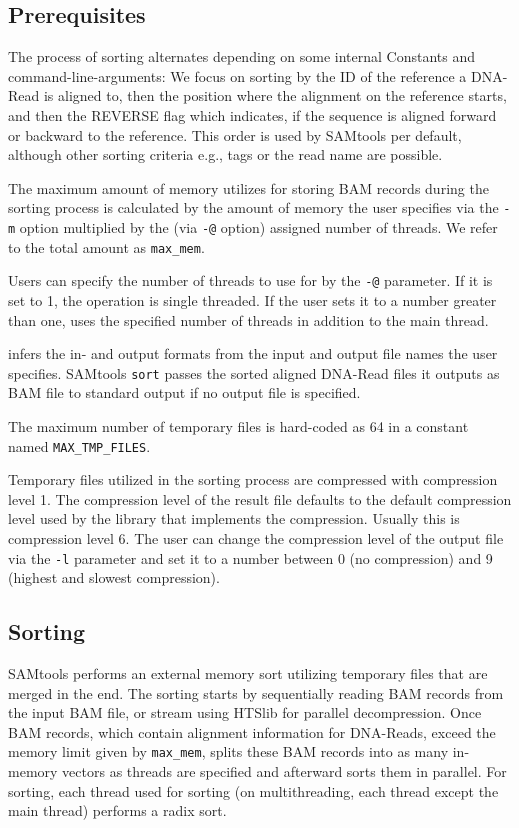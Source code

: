 \subsection{Prerequisites}
The process of sorting alternates depending on some internal Constants and command-line-arguments: 
We focus on sorting by the ID of the reference a DNA-Read is aligned to, then the position where the alignment on the reference starts, and then the REVERSE flag which indicates, if the sequence is aligned forward or backward to the reference. This order is used by SAMtools per default, although other sorting criteria e.g., tags or the read name are possible.

The maximum amount of memory \sort utilizes for storing BAM records during the sorting process is calculated by the amount of memory the user specifies via the \texttt{-m} option multiplied by the (via \texttt{-@} option) assigned number of threads. We refer to the total amount as \texttt{max\_mem}. 

Users can specify the number of threads to use for \sort by the \texttt{-@} parameter. If it is set to 1, the operation is single threaded. If the user sets it to a number greater than one, \sort uses the specified number of threads in addition to the main thread.

\sort infers the in- and output formats from the input and output file names the user specifies. SAMtools \texttt{sort} passes the sorted aligned DNA-Read files it outputs as BAM file to standard output if no output file is specified.

The maximum number of temporary files is hard-coded as 64 in a constant named \texttt{MAX\_TMP\_FILES}. 

Temporary files utilized in the sorting process are compressed with compression level 1. The compression level of the result file defaults to the default compression level used by the library that implements the compression. Usually this is compression level 6. The user can change the compression level of the output file via the \texttt{-l} parameter and set it to a number between 0 (no compression) and 9 (highest and slowest compression).

\subsection{Sorting} \label{sorting}

SAMtools performs an external memory sort utilizing temporary files that are merged in the end.
The sorting starts by sequentially reading BAM records from the input BAM file, or stream using HTSlib for parallel decompression. Once BAM records, which contain alignment information for DNA-Reads, exceed the memory limit given by \texttt{max\_mem}, \sort splits these BAM records into as many in-memory vectors as threads are specified and afterward sorts them in parallel. For sorting, each thread used for sorting (on multithreading, each thread except the main thread) performs a radix sort.

